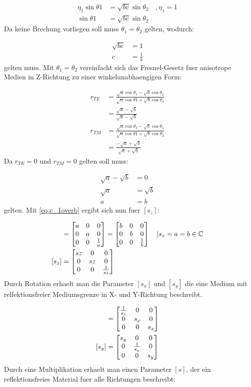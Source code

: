 \documentclass[11pt, ngerman]{article}
\begin{document}
\begin{align}
	\eta_1\sin\theta1 &= \sqrt{bc}\sin\theta_2\quad, \eta_1 = 1\\
	\sin\theta1 &= \sqrt{bc}\sin\theta_2
\end{align}
Da keine Brechung vorliegen soll muss \(\theta_1 = \theta_2\) gelten, wodurch:

\begin{align}
	\sqrt{bc} &= 1\\
	c &= \frac{1}{b}
	\label{eq:c_1overb}
\end{align}
gelten muss. Mit \(\theta_1 = \theta_2\) vereinfacht sich das Fresnel-Gesetz fuer anisotrope Medien in Z-Richtung
zu einer winkelunabhaengigen Form:

\begin{align}
	r_{TE} &= \frac{\sqrt{a}\cos\theta_1 - \sqrt{b}\cos\theta_2}{\sqrt{a}\cos\theta1 + \sqrt{b}\cos\theta_2}\\
	&= \frac{\sqrt{a} - \sqrt{b}}{\sqrt{a} - \sqrt{b}} \\
	r_{TM} &= \frac{\sqrt{a}\cos\theta_2 - \sqrt{b}\cos\theta_1}{\sqrt{a}\cos\theta1 + \sqrt{b}\cos\theta_2}\\
	&= \frac{-\sqrt{a} + \sqrt{b}}{\sqrt{a} + \sqrt{b}}
\end{align}
Da \(r_{TE} = 0\) und \(r_{TM} = 0\) gelten soll muss:

\begin{align}
	\sqrt{a} - \sqrt{b} &= 0\\
	\sqrt{a} &= \sqrt{b} \\
	a &= b
\end{align}
gelten. Mit \cref{eq:c_1overb} ergibt sich nun fuer \([s_z]\):

\begin{align}
	[s_z] &= \dt{a}{a}{\frac{1}{a}} = \dt{b}{b}{\frac{1}{b}}\quad\vert s_z = a = b \in \mathbb{C}\\
	[s_z] &= \dt{sz}{sz}{\frac{1}{sz}}
\end{align}
Durch Rotation erhaelt man die Parameter \([s_x]\) und \([s_y]\) die eine Medium mit relfektionsfreier
Mediumsgrenze in X- und Y-Richtung beschreibt.

\begin{align}
	[s_x] &= \dt{\frac{1}{s_x}}{s_x}{s_x}\\
	[s_y] &= \dt{s_y}{\frac{1}{s_y}}{s_y}
\end{align}
Durch eine Multiplikation erhaelt man einen Parameter \([s]\), der ein reflektionsfreies Material fuer
alle Richtungen beschreibt:
\end{document}
